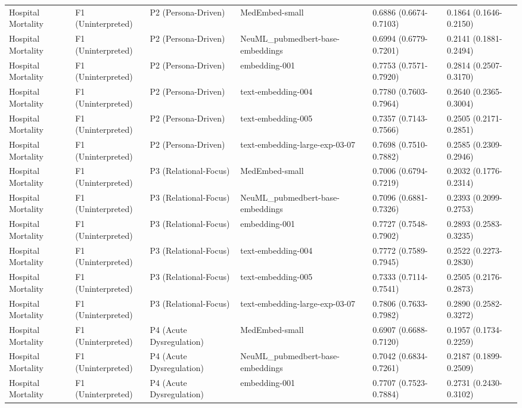 \documentclass[border=0pt]{standalone}
\begin{document}
\begin{adjustbox}{width=\textwidth}
\begin{tabular}{llllll}
Hospital Mortality & F1 (Uninterpreted) & P2 (Persona-Driven) & MedEmbed-small & 0.6886 (0.6674-0.7103) & 0.1864 (0.1646-0.2150) \\
Hospital Mortality & F1 (Uninterpreted) & P2 (Persona-Driven) & NeuML\_pubmedbert-base-embeddings & 0.6994 (0.6779-0.7201) & 0.2141 (0.1881-0.2494) \\
Hospital Mortality & F1 (Uninterpreted) & P2 (Persona-Driven) & embedding-001 & 0.7753 (0.7571-0.7920) & 0.2814 (0.2507-0.3170) \\
Hospital Mortality & F1 (Uninterpreted) & P2 (Persona-Driven) & text-embedding-004 & 0.7780 (0.7603-0.7964) & 0.2640 (0.2365-0.3004) \\
Hospital Mortality & F1 (Uninterpreted) & P2 (Persona-Driven) & text-embedding-005 & 0.7357 (0.7143-0.7566) & 0.2505 (0.2171-0.2851) \\
Hospital Mortality & F1 (Uninterpreted) & P2 (Persona-Driven) & text-embedding-large-exp-03-07 & 0.7698 (0.7510-0.7882) & 0.2585 (0.2309-0.2946) \\
Hospital Mortality & F1 (Uninterpreted) & P3 (Relational-Focus) & MedEmbed-small & 0.7006 (0.6794-0.7219) & 0.2032 (0.1776-0.2314) \\
Hospital Mortality & F1 (Uninterpreted) & P3 (Relational-Focus) & NeuML\_pubmedbert-base-embeddings & 0.7096 (0.6881-0.7326) & 0.2393 (0.2099-0.2753) \\
Hospital Mortality & F1 (Uninterpreted) & P3 (Relational-Focus) & embedding-001 & 0.7727 (0.7548-0.7902) & 0.2893 (0.2583-0.3235) \\
Hospital Mortality & F1 (Uninterpreted) & P3 (Relational-Focus) & text-embedding-004 & 0.7772 (0.7589-0.7945) & 0.2522 (0.2273-0.2830) \\
Hospital Mortality & F1 (Uninterpreted) & P3 (Relational-Focus) & text-embedding-005 & 0.7333 (0.7114-0.7541) & 0.2505 (0.2176-0.2873) \\
Hospital Mortality & F1 (Uninterpreted) & P3 (Relational-Focus) & text-embedding-large-exp-03-07 & 0.7806 (0.7633-0.7982) & 0.2890 (0.2582-0.3272) \\
Hospital Mortality & F1 (Uninterpreted) & P4 (Acute Dysregulation) & MedEmbed-small & 0.6907 (0.6688-0.7120) & 0.1957 (0.1734-0.2259) \\
Hospital Mortality & F1 (Uninterpreted) & P4 (Acute Dysregulation) & NeuML\_pubmedbert-base-embeddings & 0.7042 (0.6834-0.7261) & 0.2187 (0.1899-0.2509) \\
Hospital Mortality & F1 (Uninterpreted) & P4 (Acute Dysregulation) & embedding-001 & 0.7707 (0.7523-0.7884) & 0.2731 (0.2430-0.3102) \\

\end{tabular}
\end{adjustbox}
\end{document}
